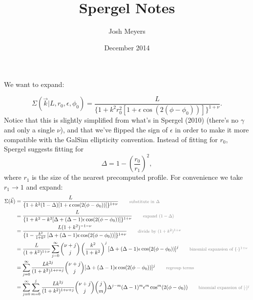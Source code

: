 \documentclass{article}
\title{Spergel Notes}
\author{Josh Meyers}
\date{December 2014}
\newcommand*{\annot}[1]{\tag*{\footnotesize{\textcolor{gray}{#1}}}}
\begin{document}
We want to expand:

\begin{equation}
  \label{eqn:SBdef}
  \Sigma(\vec{k}|L,r_0,\epsilon,\phi_0) = \frac{L}{\{1+k^2r_0^2[1+\epsilon\cos(2(\phi-\phi_0))]\}^{1+\nu}}.
\end{equation}
Notice that this is slightly simplified from what's in Spergel (2010) (there's no $\gamma$ and only a single $\nu$), and that we've flipped the sign of $\epsilon$ in order to make it more compatible with the GalSim ellipticity convention.
Instead of fitting for $r_0$, Spergel suggests fitting for
\begin{equation}
  \Delta = 1 - \left(\frac{r_0}{r_1}\right)^2,
\end{equation}
where $r_1$ is the size of the nearest precomputed profile.
For convenience we take $r_1 \rightarrow 1$ and expand:
\begin{align}
  \Sigma(\vec{k})
  &= \frac{L}{\{1+k^2(1-\Delta)[1+\epsilon\cos(2(\phi-\phi_0))]\}^{1+\nu}}
  \annot{substitute in $\Delta$} \\
  &= \frac{L}{\{1+k^2 - k^2[\Delta + (\Delta-1)\epsilon\cos(2(\phi-\phi_0))]\}^{1+\nu}}
  \annot{expand $(1-\Delta)$} \\
  &= \frac{L (1+k^2)^{-1-\nu}}{\{1 - \frac{k^2}{1+k^2}\left[\Delta + (\Delta-1)\epsilon\cos(2(\phi-\phi_0))\right]\}^{1+\nu}}
  \annot{divide by $(1+k^2)^{1+\nu}$} \\
  &= \frac{L}{(1+k^2)^{1+\nu}}\sum_{j=0}^{\infty}\binom{\nu+j}{j}\left(\frac{k^2}{1+k^2}\right)^{j}[\Delta + (\Delta-1)\epsilon\cos(2(\phi-\phi_0))]^j
  \annot{binomial expansion of $\{\cdot\}^{1+\nu}$} \\
  &= \sum_{j=0}^{\infty}\frac{L k^{2j}}{(1+k^2)^{1+\nu+j}}\binom{\nu+j}{j}[\Delta + (\Delta-1)\epsilon\cos(2(\phi-\phi_0))]^j
  \annot{regroup terms} \\
  &= \sum_{j=0}^{\infty}\sum_{m=0}^{j}\frac{L k^{2j}}{(1+k^2)^{1+\nu+j}}\binom{\nu+j}{j}\binom{j}{m}\Delta^{j-m}(\Delta-1)^m\epsilon^m\cos^m(2(\phi-\phi_0))
  \annot{binomial expansion of $[\cdot]^j$}
\end{align}
\end{document}

